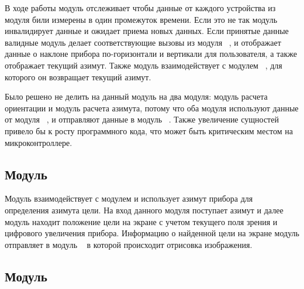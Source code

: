 В ходе работы модуль отслеживает чтобы данные от каждого устройства из модуля \moduleCalib били измерены в один промежуток времени. Если это не так
модуль инвалидирует данные и ожидает приема новых данных. Если принятые данные валидные модуль делает соответствующие вызовы из
модуля \moduleGraphics~, и отображает данные о наклоне прибора по-горизонтали и вертикали для пользователя, а также отображает текущий азимут.
Также модуль \moduleOrientationAzimuth взаимодействует с модулем \moduleFindTarget~, для которого он возвращает текущий азимут.

Было решено не делить на данный модуль на два модуля: модуль расчета ориентации и модуль расчета азимута, потому что оба модуля используют данные от модуля
\moduleCalib~, и отправляют данные в модуль \moduleGraphics~. Также увеличение сущностей привело бы к росту программного кода, что может быть критическим местом
на микроконтроллере.

\subsection{Модуль \moduleFindTarget}

Модуль взаимодействует с модулем \moduleOrientationAzimuth и использует азимут прибора для определения азимута цели. 
На вход данного модуля поступает азимут и далее модуль находит положение цели на экране с учетом
текущего поля зрения и цифрового увеличения прибора. Информацию о найденной цели на экране модуль отправляет в модуль \moduleGraphics~ 
в которой происходит отрисовка изображения.

\subsection{Модуль \moduleFlashMemory}

